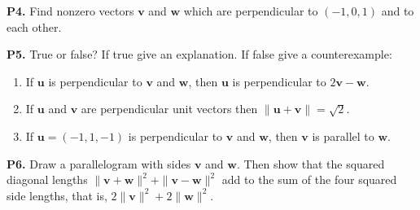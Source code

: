 \documentclass[12pt]{amsart}
\newcommand{\bu}{\mathbf{u}}
\newcommand{\bv}{\mathbf{v}}
\newcommand{\bw}{\mathbf{w}}
\newcommand{\prob}[1]{\bigskip\noindent\textbf{#1}\quad }
\begin{document}
\prob{P4.}  Find nonzero vectors $\bv$ and $\bw$ which are perpendicular to $(-1,0,1)$ and to each other.

\prob{P5.}  True or false?  If true give an explanation.  If false give a counterexample:
\renewcommand{\labelenumi}{(\alph{enumi})\,}
\begin{enumerate}
\item If $\bu$ is perpendicular to $\bv$ and $\bw$, then $\bu$ is perpendicular to $2\bv-\bw$.
\item If $\bu$ and $\bv$ are perpendicular unit vectors then $\|\bu+\bv\|=\sqrt{2}$.
\item If $\bu = (-1,1,-1)$ is perpendicular to $\bv$ and $\bw$, then $\bv$ is parallel to $\bw$.
\end{enumerate}

\prob{P6.}  Draw a parallelogram with sides $\bv$ and $\bw$.  Then show that the squared diagonal lengths $\|\bv + \bw\|^2 + \|\bv - \bw\|^2$ add to the sum of the four squared side lengths, that is, $2\|\bv\|^2+2\|\bw\|^2$.
\end{document}
